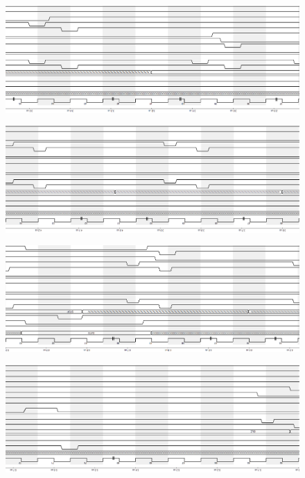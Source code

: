 \documentclass[a4paper, titlepage]{article}
\begin{document}
\begin{figure}
\centering
\includegraphics[scale=0.6]{RX_timing_pt5.png} 
\end{figure}
\begin{figure}
\centering
\includegraphics[scale=0.6]{RX_timing_pt6.png} 
\end{figure}
\begin{figure}
\centering
\includegraphics[scale=0.6]{RX_timing_pt7.png} 
\end{figure}
\begin{figure}
\centering
\includegraphics[scale=0.6]{RX_timing_pt8V2.png} 
\end{figure}
\end{document}
